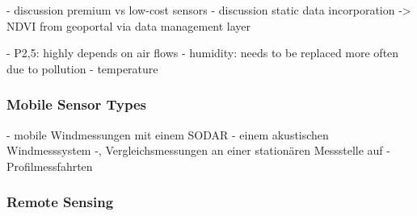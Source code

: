 
- discussion premium vs low-cost sensors
- discussion static data incorporation -> NDVI from geoportal via data management layer

- P2,5: highly depends on air flows
- humidity: needs to be replaced more often due to pollution
- temperature

\subsubsection{Mobile Sensor Types}

- mobile Windmessungen mit einem SODAR - einem akustischen Windmesssystem -, Vergleichsmessungen an einer stationären Messstelle auf
- Profilmessfahrten

\subsubsection{Remote Sensing}

